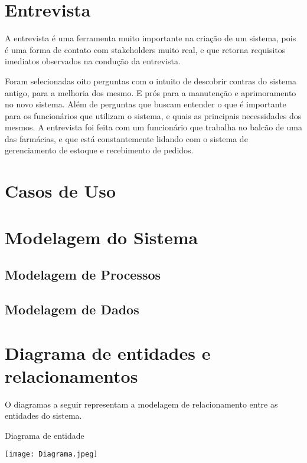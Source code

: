 \section{Entrevista}
A entrevista é uma ferramenta muito importante na criação de um sistema, pois é uma forma de
contato com stakeholders muito real, e que retorna requisitos imediatos observados na condução da
entrevista.

Foram selecionadas oito perguntas com o intuito de descobrir contras do sistema antigo, para a
melhoria dos mesmo. E prós para a manutenção e aprimoramento no novo sistema. Além de
perguntas que buscam entender o que é importante para os funcionários que utilizam o sistema,
e quais as principais necessidades dos mesmos. A entrevista foi feita com um funcionário que
trabalha no balcão de uma das farmácias, e que está constantemente lidando com o sistema de
gerenciamento de estoque e recebimento de pedidos.


\section{ Casos de Uso}



\section{Modelagem do Sistema}


\subsection{Modelagem de Processos}


\subsection{Modelagem de Dados}

\section{Diagrama de entidades e relacionamentos}
O diagramas a seguir representam a modelagem de relacionamento entre as entidades do sistema.


  \caption{Diagrama de entidade}
  \texttt{[image: Diagrama.jpeg]}
